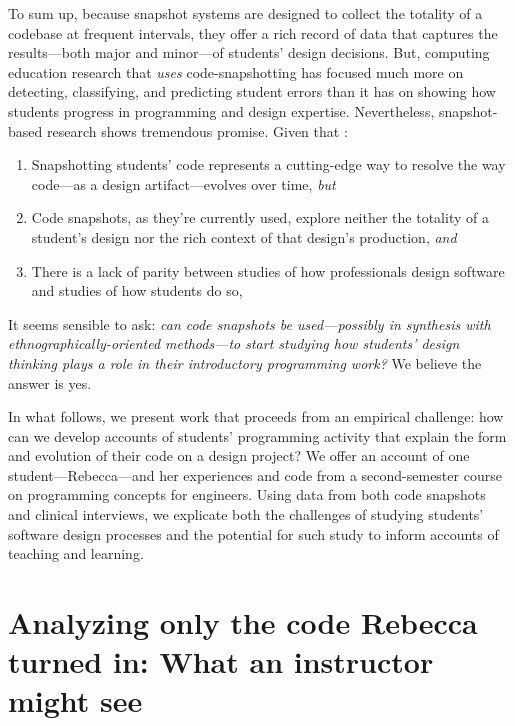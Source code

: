To sum up, because snapshot systems are designed to collect the totality
of a codebase at frequent intervals, they offer a rich record of data
that captures the results---both major and minor---of students' design
decisions. But, computing education research that \emph{uses}
code-snapshotting has focused much more on detecting, classifying, and
predicting student errors than it has on showing how students progress
in programming and design expertise. Nevertheless, snapshot-based
research shows tremendous promise. Given that :

\begin{enumerate}
\def\labelenumi{\arabic{enumi}.}
\tightlist
\item
  Snapshotting students' code represents a cutting-edge way to resolve
  the way code---as a design artifact---evolves over time, \emph{but}
\item
  Code snapshots, as they're currently used, explore neither the
  totality of a student's design nor the rich context of that design's
  production, \emph{and}
\item
  There is a lack of parity between studies of how professionals design
  software and studies of how students do so,
\end{enumerate}

It seems sensible to ask: \emph{can code snapshots be used---possibly in
synthesis with ethnographically-oriented methods---to start studying how
students' design thinking plays a role in their introductory programming
work?} We believe the answer is yes.

In what follows, we present work that proceeds from an empirical
challenge: how can we develop accounts of students' programming activity
that explain the form and evolution of their code on a design project?
We offer an account of one student---Rebecca---and her experiences and
code from a second-semester course on programming concepts for
engineers. Using data from both code snapshots and clinical interviews,
we explicate both the challenges of studying students' software design
processes and the potential for such study to inform accounts of
teaching and learning.

\section{Analyzing only the code Rebecca turned in: What an instructor might see}\label{analyzing-only-the-code-rebecca-turned-in-what-an-instructor-might-see}

